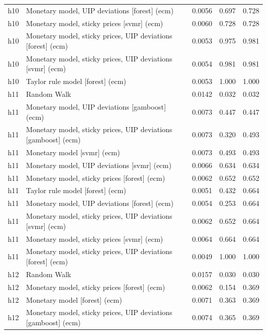\begin{ThreePartTable}
\begin{longtable}[t]{cp{5.5cm}ccc}
h10 & \raggedright Monetary model, UIP deviations [forest] (ecm) & 0.0056 & 0.697 & 0.728\\
h10 & \raggedright Monetary model, sticky prices [svmr] (ecm) & 0.0060 & 0.728 & 0.728\\
h10 & \raggedright Monetary model, sticky prices, UIP deviations [forest] (ecm) & 0.0053 & 0.975 & 0.981\\
h10 & \raggedright Monetary model, sticky prices, UIP deviations [svmr] (ecm) & 0.0054 & 0.981 & 0.981\\
h10 & \raggedright Taylor rule model [forest] (ecm) & 0.0053 & 1.000 & 1.000\\
\addlinespace
h11 & \raggedright Random Walk & 0.0142 & 0.032 & 0.032\\
h11 & \raggedright Monetary model, UIP deviations [gamboost] (ecm) & 0.0073 & 0.447 & 0.447\\
h11 & \raggedright Monetary model, sticky prices, UIP deviations [gamboost] (ecm) & 0.0073 & 0.320 & 0.493\\
h11 & \raggedright Monetary model [svmr] (ecm) & 0.0073 & 0.493 & 0.493\\
h11 & \raggedright Monetary model, UIP deviations [svmr] (ecm) & 0.0066 & 0.634 & 0.634\\
h11 & \raggedright Monetary model, sticky prices [forest] (ecm) & 0.0062 & 0.652 & 0.652\\
h11 & \raggedright Taylor rule model [forest] (ecm) & 0.0051 & 0.432 & 0.664\\
h11 & \raggedright Monetary model, UIP deviations [forest] (ecm) & 0.0054 & 0.253 & 0.664\\
h11 & \raggedright Monetary model, sticky prices, UIP deviations [svmr] (ecm) & 0.0062 & 0.652 & 0.664\\
h11 & \raggedright Monetary model, sticky prices [svmr] (ecm) & 0.0064 & 0.664 & 0.664\\
h11 & \raggedright Monetary model, sticky prices, UIP deviations [forest] (ecm) & 0.0049 & 1.000 & 1.000\\
\addlinespace
h12 & \raggedright Random Walk & 0.0157 & 0.030 & 0.030\\
h12 & \raggedright Monetary model, sticky prices [forest] (ecm) & 0.0062 & 0.154 & 0.369\\
h12 & \raggedright Monetary model [forest] (ecm) & 0.0071 & 0.363 & 0.369\\
h12 & \raggedright Monetary model, sticky prices, UIP deviations [gamboost] (ecm) & 0.0074 & 0.365 & 0.369\\

\end{longtable}
\end{ThreePartTable}
